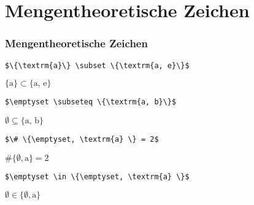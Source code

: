 \section{Mengentheoretische Zeichen}

\begin{frame}[fragile]
\frametitle{Mengentheoretische Zeichen}


{\small
\begin{lstlisting}
$\{\textrm{a}\} \subset \{\textrm{a, e}\}$
\end{lstlisting}
}

\ea $\{\textrm{a}\} \subset \{\textrm{a, e}\}$
\z 


{\small
\begin{lstlisting}
$\emptyset \subseteq \{\textrm{a, b}\}$
\end{lstlisting}
}

\ea $\emptyset \subseteq \{\textrm{a, b}\}$
\z 


{\small
\begin{lstlisting}
$\# \{\emptyset, \textrm{a} \} = 2$
\end{lstlisting}
}

\ea $\# \{\emptyset, \textrm{a} \} = 2$
\z 


{\small
\begin{lstlisting}
$\emptyset \in \{\emptyset, \textrm{a} \}$
\end{lstlisting}
}

\ea $\emptyset \in \{\emptyset, \textrm{a} \}$
\z 
\end{frame}



